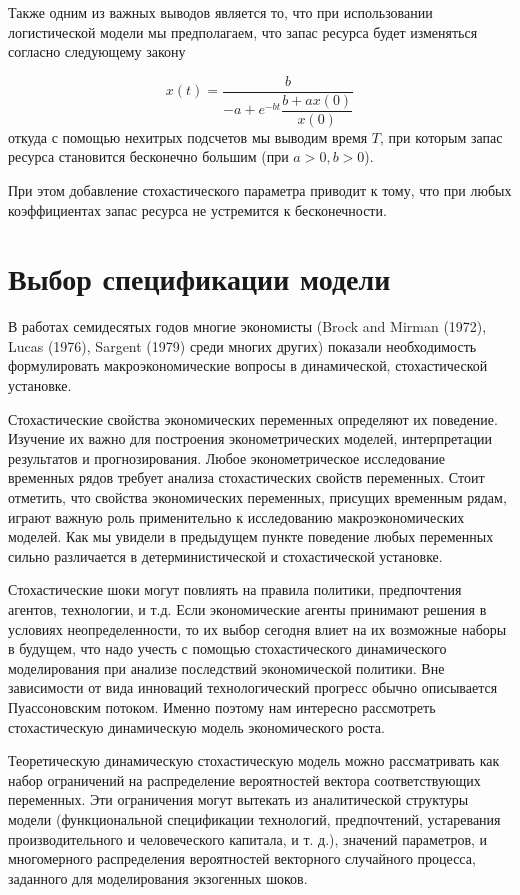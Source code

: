 \documentclass[12pt,a4paper, oneside]{extreport}
\begin{document}
Также одним из важных выводов является то, что при использовании логистической модели мы предполагаем, что запас ресурса будет изменяться согласно следующему закону

\begin{equation}\label{key}
x(t) = \dfrac{b}{-a + e^{-bt}\dfrac{b + a x(0)}{x(0)}} 
\end{equation} 
откуда с помощью нехитрых подсчетов мы выводим время $ T $, при которым запас ресурса становится бесконечно   большим (при $a>0, b>0  $).   

При этом добавление стохастического параметра приводит к тому, что при  любых коэффициентах запас ресурса не устремится к бесконечности.

\section{Выбор спецификации модели}


В работах  семидесятых годов  многие экономисты (Brock and Mirman (1972), Lucas (1976), Sargent (1979)  среди многих других) показали необходимость формулировать макроэкономические вопросы в динамической, стохастической установке.

Стохастические свойства экономических переменных определяют их поведение. Изучение их  важно для построения эконометрических моделей, интерпретации результатов и прогнозирования. 
Любое эконометрическое исследование временных рядов требует анализа стохастических свойств переменных. 
Стоит отметить, что свойства экономических переменных, присущих  временным рядам,   играют  важную роль применительно к исследованию макроэкономических моделей. Как мы  увидели в предыдущем пункте поведение любых переменных сильно различается в детерминистической и стохастической установке.  


Стохастические шоки могут  повлиять  на правила политики, предпочтения агентов,  технологии, и т.д. Если  экономические агенты принимают решения в условиях неопределенности, то  их выбор сегодня  влиет на их  возможные наборы в будущем, что надо учесть с помощью  стохастического   динамического моделирования при анализе  последствий  экономической политики. 
Вне зависимости от вида  инноваций технологический прогресс обычно описывается  Пуассоновским потоком.
Именно поэтому нам интересно рассмотреть стохастическую динамическую модель экономического роста. 





Теоретическую динамическую стохастическую модель можно рассматривать как набор ограничений на  распределение вероятностей  вектора соответствующих переменных.  
Эти ограничения могут вытекать  из аналитической структуры модели (функциональной спецификации технологий, предпочтений, устаревания производительного и человеческого капитала, и т. д.),  значений параметров,
и  многомерного распределения вероятностей векторного случайного процесса, заданного для моделирования экзогенных шоков.
\end{document}
